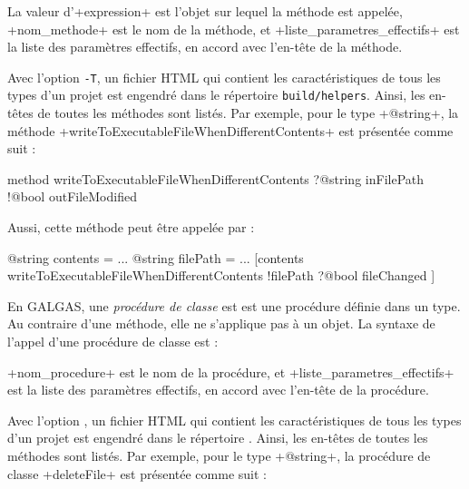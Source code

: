 La valeur d'\ggs+expression+ est l'objet sur lequel la méthode est appelée, \ggs+nom_methode+ est le nom de la méthode, et \ggs+liste_parametres_effectifs+ est la liste des paramètres effectifs, en accord avec l'en-tête de la méthode.

Avec l'option \texttt{-T}, un fichier HTML qui contient les caractéristiques de tous les types d'un projet est engendré dans le répertoire \texttt{build/helpers}. Ainsi, les en-têtes de toutes les méthodes sont listés. Par exemple, pour le type \ggs+@string+, la méthode \ggs+writeToExecutableFileWhenDifferentContents+ est présentée comme suit :

\begin{galgas}
method writeToExecutableFileWhenDifferentContents
  ?@string inFilePath
  !@bool outFileModified
\end{galgas}


Aussi, cette méthode peut être appelée par :
\begin{galgas}
@string contents = ...
@string filePath = ...
[contents writeToExecutableFileWhenDifferentContents
  !filePath
  ?@bool fileChanged
]
\end{galgas}
















En GALGAS, une \emph{procédure de classe} est est une procédure définie dans un type. Au contraire d'une méthode, elle ne s'applique pas à un objet. La syntaxe de l'appel d'une procédure de classe est :
\begin{galgas}
\end{galgas}

\ggs+nom_procedure+ est le nom de la procédure, et \ggs+liste_parametres_effectifs+ est la liste des paramètres effectifs, en accord avec l'en-tête de la procédure.

Avec l'option , un fichier HTML qui contient les caractéristiques de tous les types d'un projet est engendré dans le répertoire . Ainsi, les en-têtes de toutes les méthodes sont listés. Par exemple, pour le type \ggs+@string+, la procédure de classe \ggs+deleteFile+ est présentée comme suit :


